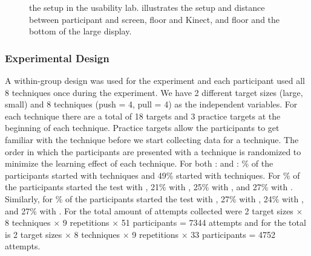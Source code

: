 \begin{figure}[H]
\caption{\protect{} the setup in the usability lab. \protect{} illustrates the setup and distance between participant and screen, floor and Kinect, and floor and the bottom of the large display.}
\end{figure}

\subsubsection{Experimental Design} \label{}
A within-group design was used for the experiment and each participant used all 8 techniques once during the experiment.
We have 2 different target sizes (large, small) and 8 techniques (push = 4, pull = 4) as the independent variables.
For each technique there are a total of 18 targets and 3 practice targets at the beginning of each technique. 
Practice targets allow the participants to get familiar with the technique before we start collecting data for a technique.
The order in which the participants are presented with a technique is randomized to minimize the learning effect of each technique.
For both \studyone: \target and \studytwo: \% of the participants started with \push techniques and 49\% started with \pull techniques.
For \% of the participants started the test with \grab, 21\% with \swipe, 25\% with \throw, and 27\% with \tilt.
Similarly, for \% of the participants started the test with \grab, 27\% with \swipe, 24\% with \throw, and 27\% with \tilt.
For \studyone the total amount of attempts collected were 2 target sizes $\times$ 8 techniques $\times$ 9 repetitions $\times$ 51 participants = 7344 attempts and for \studytwo the total is 2 target sizes $\times$ 8 techniques $\times$ 9 repetitions $\times$ 33 participants = 4752 attempts.

